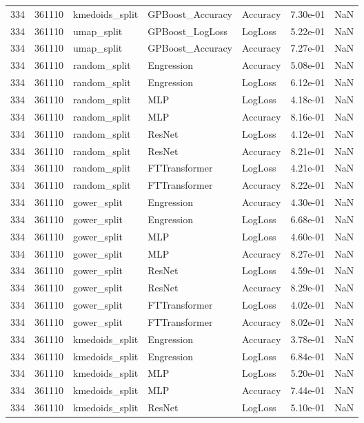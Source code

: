 \begin{tabular}{rrlllrr}
334 & 361110 & kmedoids\_split & GPBoost\_Accuracy & Accuracy & 7.30e-01 & NaN \\
334 & 361110 & umap\_split & GPBoost\_LogLoss & LogLoss & 5.22e-01 & NaN \\
334 & 361110 & umap\_split & GPBoost\_Accuracy & Accuracy & 7.27e-01 & NaN \\
334 & 361110 & random\_split & Engression & Accuracy & 5.08e-01 & NaN \\
334 & 361110 & random\_split & Engression & LogLoss & 6.12e-01 & NaN \\
334 & 361110 & random\_split & MLP & LogLoss & 4.18e-01 & NaN \\
334 & 361110 & random\_split & MLP & Accuracy & 8.16e-01 & NaN \\
334 & 361110 & random\_split & ResNet & LogLoss & 4.12e-01 & NaN \\
334 & 361110 & random\_split & ResNet & Accuracy & 8.21e-01 & NaN \\
334 & 361110 & random\_split & FTTransformer & LogLoss & 4.21e-01 & NaN \\
334 & 361110 & random\_split & FTTransformer & Accuracy & 8.22e-01 & NaN \\
334 & 361110 & gower\_split & Engression & Accuracy & 4.30e-01 & NaN \\
334 & 361110 & gower\_split & Engression & LogLoss & 6.68e-01 & NaN \\
334 & 361110 & gower\_split & MLP & LogLoss & 4.60e-01 & NaN \\
334 & 361110 & gower\_split & MLP & Accuracy & 8.27e-01 & NaN \\
334 & 361110 & gower\_split & ResNet & LogLoss & 4.59e-01 & NaN \\
334 & 361110 & gower\_split & ResNet & Accuracy & 8.29e-01 & NaN \\
334 & 361110 & gower\_split & FTTransformer & LogLoss & 4.02e-01 & NaN \\
334 & 361110 & gower\_split & FTTransformer & Accuracy & 8.02e-01 & NaN \\
334 & 361110 & kmedoids\_split & Engression & Accuracy & 3.78e-01 & NaN \\
334 & 361110 & kmedoids\_split & Engression & LogLoss & 6.84e-01 & NaN \\
334 & 361110 & kmedoids\_split & MLP & LogLoss & 5.20e-01 & NaN \\
334 & 361110 & kmedoids\_split & MLP & Accuracy & 7.44e-01 & NaN \\
334 & 361110 & kmedoids\_split & ResNet & LogLoss & 5.10e-01 & NaN \\

\end{tabular}
